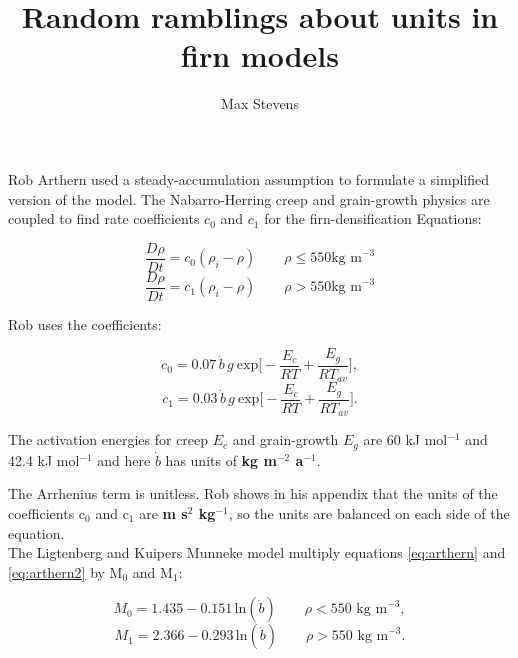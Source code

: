 \documentclass[12pt]{scrartcl}
\begin{document}
\title{Random ramblings about units in firn models}
\author{Max Stevens}
\maketitle

Rob Arthern used a steady-accumulation assumption to formulate a simplified version of the model. The Nabarro-Herring creep and grain-growth physics are coupled to find rate coefficients $c_0$ and $c_1$ for the firn-densification Equations:

\begin{equation}
\label{eq:firn_general}
\frac{D\rho}{Dt} = c_0(\rho_i -\rho) \quad \quad \rho\le550 \text{kg m}^{-3}
\end{equation}
\begin{equation}
\label{eq:firn_general2}
\frac{D\rho}{Dt} = c_1 (\rho_i -\rho) \quad \quad \rho>550  \text{kg m}^{-3}
\end{equation}

Rob uses the coefficients:

\begin{equation}
\label{eq:arthern}
c_0 =  0.07\, \dot{b}\,g \ \textrm{exp}\bigg[-\frac{E_c}{RT}+\frac{E_g}{RT_{av}}\bigg],
\end{equation}
\begin{equation}
\label{eq:arthern2}
c_1 = 0.03\, \dot{b}\,g \ \textrm{exp}\bigg[-\frac{E_c}{RT}+\frac{E_g}{RT_{av}}\bigg].
\end{equation}

The activation energies for creep $E_c$ and grain-growth $E_g$ are 60 kJ mol$^{-1}$ and 42.4 kJ mol$^{-1}$ and here $\dot{b}$ has units of \textbf{kg m$^{-2}$ a$^{-1}$}.

The Arrhenius term is unitless. Rob shows in his appendix that the units of the coefficients c$_{0}$ and c$_{1}$ are \textbf{ m s$^{2}$ kg$^{-1}$}, so the units are balanced on each side of the equation.\\

The Ligtenberg and Kuipers Munneke model multiply equations \ref{eq:arthern} and \ref{eq:arthern2} by M$_{0}$ and M$_{1}$:

\begin{equation}
M_0= 1.435-0.151\, \textrm{ln}(\dot{b})  \quad \quad \rho<550  \text{ kg m}^{-3},
\end{equation}
\begin{equation}
M_1 = 2.366-0.293\, \textrm{ln}(\dot{b})  \quad \quad \rho>550  \text{ kg m}^{-3}.
\end{equation}
\end{document}
